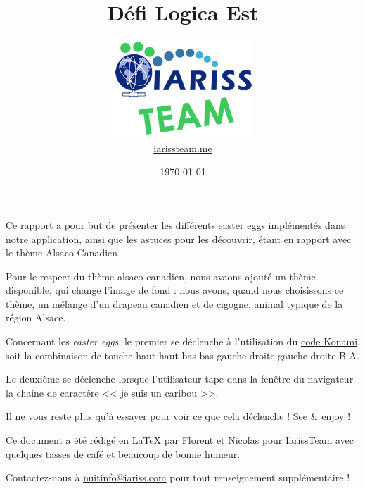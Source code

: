 \documentclass[12pt, a4paper]{article}
\title{Défi Logica Est}
\newcommand{\espace}{\vspace{.8cm}}
\newcommand{\authors}{Florent et Nicolas}
\begin{document}
\author{\includegraphics{../_img/iariss_team.png} \\ {\sffamily \href{http://iarissteam.me}{iarissteam.me}}}
\date{\today}

\maketitle{}

{\sffamily Ce rapport a pour but de présenter les différents easter eggs implémentés dans notre application, ainsi que les astuces pour les découvrir, étant en rapport avec le thème Alsaco-Canadien}

\espace{}
Pour le respect du thème alsaco-canadien, nous avaons ajouté un thème disponible, qui change l'image de fond : nous avons, quand nous choisissons ce thème, un mélange d'un drapeau canadien et de cigogne, animal typique de la région Alsace.

Concernant les \emph{easter eggs}, le premier se déclenche à l'utilisation du \href{http://fr.wikipedia.org/wiki/Code_Konami}{code Konami}, soit la combinaison de touche haut haut bas bas gauche droite gauche droite B A.

Le deuxième se déclenche lorsque l'utilisateur tape dans la fenêtre du navigateur la chaine de caractère << je suis un caribou >>.

Il ne vous reste plus qu'à essayer pour voir ce que cela déclenche ! See \& enjoy !


\espace\vfill{}
Ce document a été rédigé en \LaTeX{} par \authors{} pour IarissTeam avec quelques tasses de café et beaucoup de bonne humeur.

Contactez-nous à \href{mailto:nuitinfo@iariss.com}{nuitinfo@iariss.com} pour tout renseignement supplémentaire !
\end{document}

